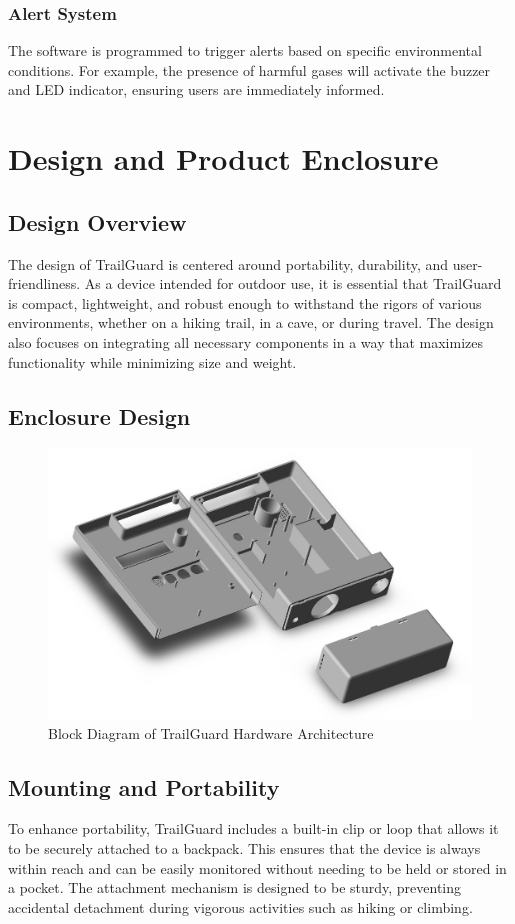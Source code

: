 \documentclass[a4paper,11pt]{article}%
\begin{document}
 \subsubsection{Alert System}
 The software is programmed to trigger alerts based on specific environmental conditions. For example, the presence of harmful gases will activate the buzzer and LED indicator, ensuring users are immediately informed.


\section{Design and Product Enclosure}
\subsection{Design Overview}
The design of TrailGuard is centered around portability, durability, and user-friendliness. As a device intended for outdoor use, it is essential that TrailGuard is compact, lightweight, and robust enough to withstand the rigors of various environments, whether on a hiking trail, in a cave, or during travel. The design also focuses on integrating all necessary components in a way that maximizes functionality while minimizing size and weight.
\subsection{Enclosure Design} 
\begin{figure}[!h]
    \centering
    \includegraphics[scale=0.7]{figures/Enclosure.jpg}
    \caption{Block Diagram of TrailGuard Hardware Architecture}
\end{figure}
\subsection{Mounting and Portability}
To enhance portability, TrailGuard includes a built-in clip or loop that allows it to be securely attached to a backpack. This ensures that the device is always within reach and can be easily monitored without needing to be held or stored in a pocket. The attachment mechanism is designed to be sturdy, preventing accidental detachment during vigorous activities such as hiking or climbing.
\end{document}
